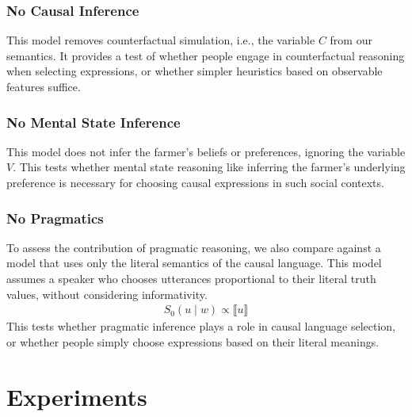\documentclass[10pt,letterpaper]{article}
\begin{document}
\subsubsection{No Causal Inference}
This model removes counterfactual simulation, i.e., the variable $C$ from our semantics. 
It provides a test of whether people engage in counterfactual reasoning when selecting expressions, or whether simpler heuristics based on observable features suffice.

\subsubsection{No Mental State Inference}

This model does not infer the farmer's beliefs or preferences, ignoring the variable $V$.
This tests whether mental state reasoning like inferring the farmer's underlying preference is necessary for choosing causal expressions in such social contexts.

\subsubsection{No Pragmatics}

To assess the contribution of pragmatic reasoning, we also compare against a model that uses only the literal semantics of the causal language.
This model assumes a speaker who chooses utterances proportional to their literal truth values, without considering informativity.
\begin{align}
    {S_0}(u \mid w) \propto \llbracket u \rrbracket
\end{align}
This tests whether pragmatic inference plays a role in causal language selection, or whether people simply choose expressions based on their literal meanings.

\section{Experiments}
\end{document}

